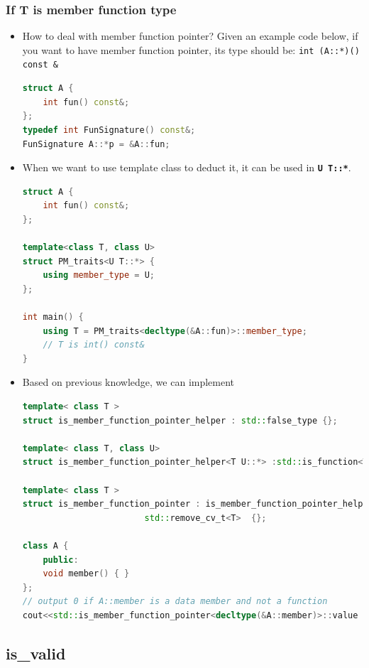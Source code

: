 \documentclass[a4paper,11pt,twoside]{book}
\begin{document}
\subsubsection{If T is member function type}
\begin{itemize}
	\item How to deal with member function pointer? Given an example code below, if you want to have member function pointer, its type should be: \texttt{int (A::*)() const \&} 
\begin{lstlisting}[frame=single, language=c++]
struct A {
	int fun() const&;
};
typedef int FunSignature() const&;
FunSignature A::*p = &A::fun;
\end{lstlisting}
\item When we want to use template class to deduct it, it can be used in \textbf{\texttt{U T::*}}.
\begin{lstlisting}[frame=single, language=c++]
struct A {
	int fun() const&;
};

template<class T, class U>
struct PM_traits<U T::*> {
	using member_type = U;
};

int main() {
	using T = PM_traits<decltype(&A::fun)>::member_type; 
	// T is int() const&
}
\end{lstlisting}

\item Based on previous knowledge, we can implement 
\begin{lstlisting}[frame=single, language=c++]
template< class T >
struct is_member_function_pointer_helper : std::false_type {};

template< class T, class U>
struct is_member_function_pointer_helper<T U::*> :std::is_function<T> {};

template< class T >
struct is_member_function_pointer : is_member_function_pointer_helper<
                        std::remove_cv_t<T>  {};

class A {
	public:
	void member() { }
};
// output 0 if A::member is a data member and not a function
cout<<std::is_member_function_pointer<decltype(&A::member)>::value
\end{lstlisting}
\end{itemize}

\subsection{is\_valid}
\end{document}
